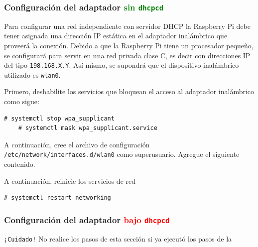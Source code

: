 \documentclass[letterpaper,10.5pt]{article}
\begin{document}
%
%
\subsubsection{Configuración del adaptador \textcolor{Green}{sin \texttt{dhcpcd}}}%
\label{sec:ap-adapter-new}

Para configurar una red independiente con servidor DHCP la Raspberry Pi debe tener asignada una dirección IP estática en el adaptador inalámbrico que proveerá la conexión.
Debido a que la Raspberry Pi tiene un procesador pequeño, se configurará para servir en una red privada clase C, es decir con direcciones IP del tipo \texttt{198.168.X.Y}.
Así mismo, se supondrá que el dispositivo inalámbrico utilizado es \texttt{wlan0}.

\medskip{}

Primero, deshabilite los servicios que bloquean el acceso al adaptador inalámbrico como sigue:
\begin{Verbatim}[gobble=1,commentchar=\%]
	# systemctl stop wpa_supplicant
	# systemctl mask wpa_supplicant.service
\end{Verbatim}

A continuación, cree el archivo de configuración \texttt{/etc/network/interfaces.d/wlan0} como superusuario.
Agregue el siguiente contenido.


A continuación, reinicie los servicios de red

\begin{Verbatim}[gobble=1,commentchar=\%]
	# systemctl restart networking
\end{Verbatim}



%
%
\subsubsection{Configuración del adaptador \textcolor{Red}{bajo \texttt{dhcpcd}}}%
\label{sec:ap-adapter-dhcpcd}

\begin{yellowbox}{\texttt{¡Cuidado!}}
	No realice los pasos de esta sección si ya ejecutó los pasos de la 
\end{yellowbox}
\end{document}
